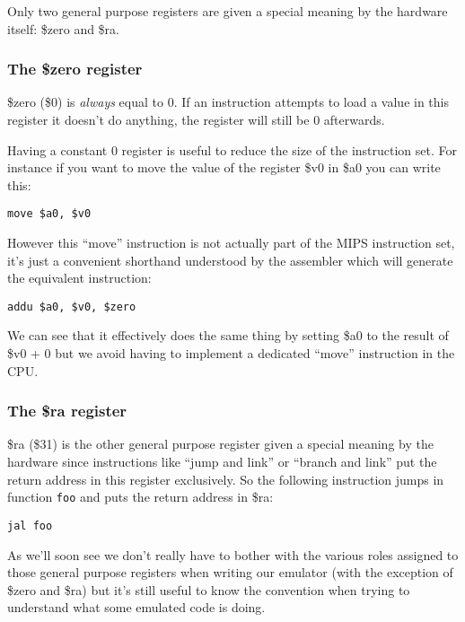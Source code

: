 \documentclass[a4paper]{article}
\newcommand{\code}[1] {\texttt{#1}}
\begin{document}
Only two general purpose registers are given a special meaning by the
hardware itself: \$zero and \$ra.

\subsubsection{The \$zero register}

\$zero (\$0) is \emph{always} equal to 0. If an instruction attempts
to load a value in this register it doesn't do anything, the register
will still be 0 afterwards.

Having a constant 0 register is useful to reduce the size of the
instruction set. For instance if you want to move the value of the
register \$v0 in \$a0 you can write this:

\begin{lstlisting}[language=assembly]
move $a0, $v0
\end{lstlisting}

However this ``move'' instruction is not actually part of the MIPS
instruction set, it's just a convenient shorthand understood by the
assembler which will generate the equivalent instruction:

\begin{lstlisting}[language=assembly]
addu $a0, $v0, $zero
\end{lstlisting}

We can see that it effectively does the same thing by setting \$a0 to
the result of \$v0 + 0 but we avoid having to implement a dedicated
``move'' instruction in the CPU.

\subsubsection{The \$ra register}

\$ra (\$31) is the other general purpose register given a special
meaning by the hardware since instructions like ``jump and link'' or
``branch and link'' put the return address in this register
exclusively. So the following instruction jumps in function
\code{foo} and puts the return address in \$ra:

\begin{lstlisting}[language=assembly]
jal foo
\end{lstlisting}

As we'll soon see we don't really have to bother with the various
roles assigned to those general purpose registers when writing our
emulator (with the exception of \$zero and \$ra) but it's still useful
to know the convention when trying to understand what some emulated
code is doing.
\end{document}
